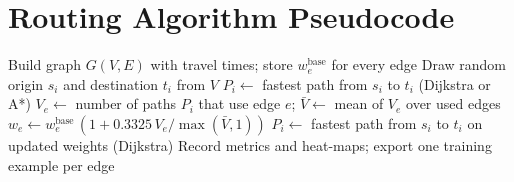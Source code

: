 \documentclass[12pt]{report}
\begin{document}





\appendix
\chapter{Routing Algorithm Pseudocode}

\begin{algorithm}[H]
\caption{One simulation run with congestion-aware re-routing}
\begin{algorithmic}[1]
\State Build graph $G(V,E)$ with travel times; store $w_e^{\text{base}}$ for every edge
  \Repeat
    \State Draw random origin $s_i$ and destination $t_i$ from $V$
  \State $P_i \gets$ fastest path from $s_i$ to $t_i$ (Dijkstra or A*)
\EndFor
\State $V_e \gets$ number of paths $P_i$ that use edge $e$; \quad $\bar{V} \gets$ mean of $V_e$ over used edges
  \State $w_e \gets w_e^{\text{base}}\,(1 + 0.3325\,V_e/\max(\bar{V},1))$ 
\EndFor
{}
  \State $P_i \gets$ fastest path from $s_i$ to $t_i$ on updated weights (Dijkstra)
\EndFor
\State Record metrics and heat-maps; export one training example per edge
\end{algorithmic}
\end{algorithm}
\end{document}
